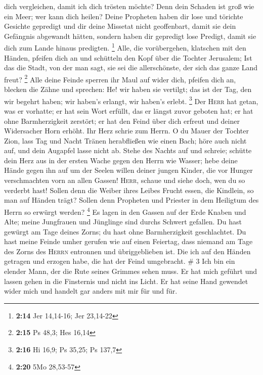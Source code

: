 dich vergleichen, damit ich dich trösten möchte? Denn dein Schaden ist
groß wie ein Meer; wer kann dich heilen?  Deine Propheten
haben dir lose und törichte Gesichte gepredigt und dir deine Missetat
nicht geoffenbart, damit sie dein Gefängnis abgewandt hätten, sondern
haben dir gepredigt lose Predigt, damit sie dich zum Lande hinaus
predigten. \footnote{\textbf{2:14} Jer 14,14-16; Jer 23,14-22}
 Alle, die vorübergehen, klatschen mit den Händen,
pfeifen dich an und schütteln den Kopf über die Tochter Jerusalem; Ist
das die Stadt, von der man sagt, sie sei die allerschönste, der sich das
ganze Land freut? \footnote{\textbf{2:15} Ps 48,3; Hes 16,14}
 Alle deine Feinde sperren ihr Maul auf wider dich,
pfeifen dich an, blecken die Zähne und sprechen: He! wir haben sie
vertilgt; das ist der Tag, den wir begehrt haben; wir haben's erlangt,
wir haben's erlebt. \footnote{\textbf{2:16} Hi 16,9; Ps 35,25; Ps 137,7}
 Der \textsc{Herr} hat getan, was er vorhatte; er hat
sein Wort erfüllt, das er längst zuvor geboten hat; er hat ohne
Barmherzigkeit zerstört; er hat den Feind über dich erfreut und deiner
Widersacher Horn erhöht.  Ihr Herz schrie zum Herrn. O du
Mauer der Tochter Zion, lass Tag und Nacht Tränen herabfließen wie einen
Bach; höre auch nicht auf, und dein Augapfel lasse nicht ab.
 Stehe des Nachts auf und schreie; schütte dein Herz aus
in der ersten Wache gegen den Herrn wie Wasser; hebe deine Hände gegen
ihn auf um der Seelen willen deiner jungen Kinder, die vor Hunger
verschmachten vorn an allen Gassen!  \textsc{Herr},
schaue und siehe doch, wen du so verderbt hast! Sollen denn die Weiber
ihres Leibes Frucht essen, die Kindlein, so man auf Händen trägt? Sollen
denn Propheten und Priester in dem Heiligtum des Herrn so erwürgt
werden? \footnote{\textbf{2:20} 5Mo 28,53-57}  Es lagen
in den Gassen auf der Erde Knaben und Alte; meine Jungfrauen und
Jünglinge sind durchs Schwert gefallen. Du hast gewürgt am Tage deines
Zorns; du hast ohne Barmherzigkeit geschlachtet.  Du hast
meine Feinde umher gerufen wie auf einen Feiertag, dass niemand am Tage
des Zorns des \textsc{Herrn} entronnen und übriggeblieben ist. Die ich
auf den Händen getragen und erzogen habe, die hat der Feind umgebracht.
\# 3  Ich bin ein elender Mann, der die Rute seines
Grimmes sehen muss.  Er hat mich geführt und lassen gehen
in die Finsternis und nicht ins Licht.  Er hat seine Hand
gewendet wider mich und handelt gar anders mit mir für und für.
